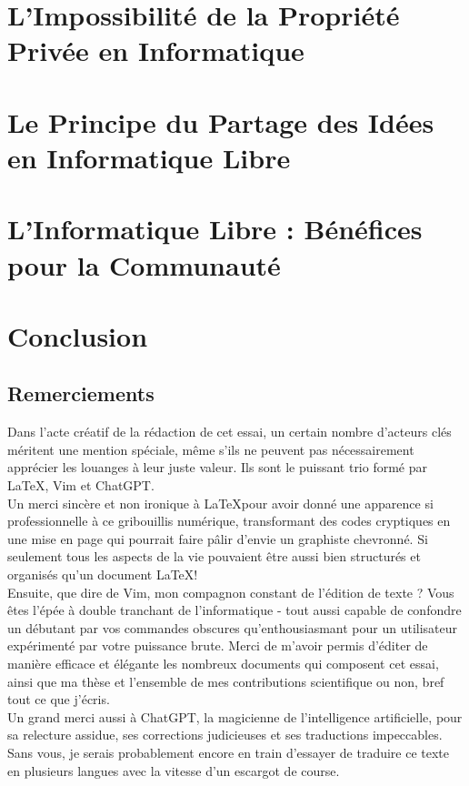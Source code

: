 \documentclass[10pt]{book}
\begin{document}
\chapter{L'Impossibilité de la Propriété Privée en Informatique}

\chapter{Le Principe du Partage des Idées en Informatique Libre}

\chapter{L'Informatique Libre : Bénéfices pour la Communauté}


\chapter*{Conclusion}


\section*{Remerciements}
Dans l'acte créatif de la rédaction de cet essai, un certain nombre d'acteurs clés méritent une mention spéciale, même s'ils ne peuvent pas nécessairement apprécier les louanges à leur juste valeur. Ils sont le puissant trio formé par \LaTeX, Vim et ChatGPT.\\

Un merci sincère et non ironique à \LaTeX pour avoir donné une apparence si professionnelle à ce gribouillis numérique, transformant des codes cryptiques en une mise en page qui pourrait faire pâlir d'envie un graphiste chevronné. Si seulement tous les aspects de la vie pouvaient être aussi bien structurés et organisés qu'un document \LaTeX !\\

Ensuite, que dire de Vim, mon compagnon constant de l'édition de texte ? Vous êtes l'épée à double tranchant de l'informatique - tout aussi capable de confondre un débutant par vos commandes obscures qu'enthousiasmant pour un utilisateur expérimenté par votre puissance brute. Merci de m'avoir permis d'éditer de manière efficace et élégante les nombreux documents qui composent cet essai, ainsi que ma thèse et l'ensemble de mes contributions scientifique ou non, bref tout ce que j'écris.\\

Un grand merci aussi à ChatGPT, la magicienne de l'intelligence artificielle, pour sa relecture assidue, ses corrections judicieuses et ses traductions impeccables. Sans vous, je serais probablement encore en train d'essayer de traduire ce texte en plusieurs langues avec la vitesse d'un escargot de course.\\
\end{document}
